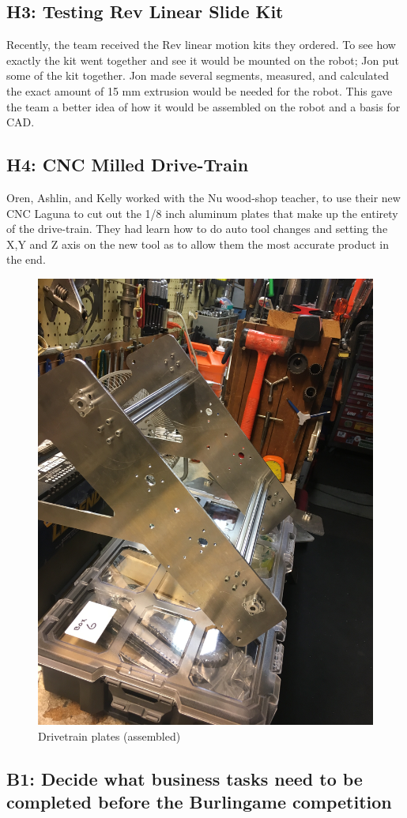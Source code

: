 \documentclass{article}
\begin{document}
\subsection{H3: Testing Rev Linear Slide Kit}

Recently, the team received the Rev linear motion kits they ordered. To see how exactly the kit went together and see it would be mounted on the robot; Jon put some of the kit together. Jon made several segments, measured, and calculated the exact amount of 15 mm extrusion would be needed for the robot. This gave the team a better idea of how it would be assembled on the robot and a basis for CAD.

\subsection{H4: CNC Milled Drive-Train }

Oren, Ashlin, and Kelly worked with the Nu wood-shop teacher, to use their new CNC Laguna to cut out the 1/8 inch aluminum plates that make up the entirety of the drive-train. They had learn how to do auto tool changes and setting the X,Y and Z axis on the new tool as to allow them the most accurate product in the end.

\begin{figure}
    \centering
    \includegraphics[width=.6 \textwidth]{07_10-15/images/drivetrain.JPG}
    \caption{Drivetrain plates (assembled)}
    \label{fig:plates}
\end{figure}
\subsection{B1: Decide what business tasks need to be completed before the Burlingame competition}
\end{document}
